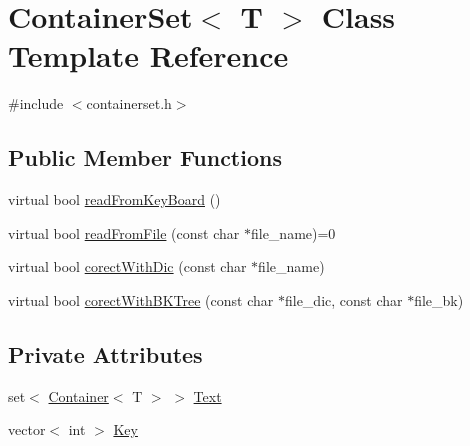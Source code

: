 \hypertarget{class_container_set}{\section{Container\+Set$<$ T $>$ Class Template Reference}
\label{class_container_set}
}


{\ttfamily \#include $<$containerset.\+h$>$}

\subsection*{Public Member Functions}
\begin{DoxyCompactItemize}
\item 
virtual bool \hyperlink{class_container_set_aba7a128616736bc4efb4bb5e4ef1dadd}{read\+From\+Key\+Board} ()
\item 
virtual bool \hyperlink{class_container_set_aa5973232e6374ea693f188eeb1982735}{read\+From\+File} (const char $\ast$file\+\_\+name)=0
\item 
virtual bool \hyperlink{class_container_set_aac5a8eedcfcd3f8f05bfdff1e20a5227}{corect\+With\+Dic} (const char $\ast$file\+\_\+name)
\item 
virtual bool \hyperlink{class_container_set_aa46b6b7c804801a81d79b053d30c64b3}{corect\+With\+B\+K\+Tree} (const char $\ast$file\+\_\+dic, const char $\ast$file\+\_\+bk)
\end{DoxyCompactItemize}
\subsection*{Private Attributes}
\begin{DoxyCompactItemize}
\item 
set$<$ \hyperlink{class_container}{Container}$<$ T $>$ $>$ \hyperlink{class_container_set_ad3732a30ded6aa6c9971197a2e1b54d0}{Text}
\item 
vector$<$ int $>$ \hyperlink{class_container_set_a0dcaa451e79c52b46e9918c1c168af8d}{Key}
\end{DoxyCompactItemize}


